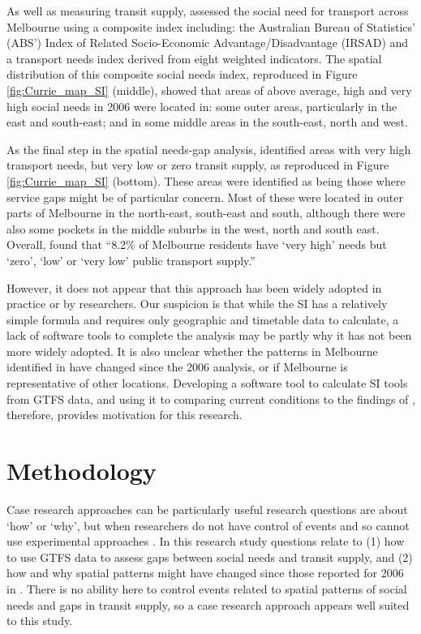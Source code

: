 \documentclass[preprint, 3p,
authoryear]{elsarticle} %
\begin{document}
As well as measuring transit supply, \citet{currie2010identifying}
assessed the social need for transport across Melbourne using a
composite index including: the Australian Bureau of Statistics' (ABS')
Index of Related Socio-Economic Advantage/Disadvantage (IRSAD) and a
transport needs index derived from eight weighted indicators. The
spatial distribution of this composite social needs index, reproduced in
Figure \ref{fig:Currie_map_SI} (middle), showed that areas of above
average, high and very high social needs in 2006 were located in: some
outer areas, particularly in the east and south-east; and in some middle
areas in the south-east, north and west.

As the final step in the spatial needs-gap analysis,
\citet{currie2010identifying} identified areas with very high transport
needs, but very low or zero transit supply, as reproduced in Figure
\ref{fig:Currie_map_SI} (bottom). These areas were identified as being
those where service gaps might be of particular concern. Most of these
were located in outer parts of Melbourne in the north-east, south-east
and south, although there were also some pockets in the middle suburbs
in the west, north and south east. Overall,
\citet{currie2010identifying} found that ``8.2\% of Melbourne residents
have `very high' needs but `zero', `low' or `very low' public transport
supply.''

However, it does not appear that this approach has been widely adopted
in practice or by researchers. Our suspicion is that while the SI has a
relatively simple formula and requires only geographic and timetable
data to calculate, a lack of software tools to complete the analysis may
be partly why it has not been more widely adopted. It is also unclear
whether the patterns in Melbourne identified in
\citet{currie2010identifying} have changed since the 2006 analysis, or
if Melbourne is representative of other locations. Developing a software
tool to calculate SI tools from GTFS data, and using it to comparing
current conditions to the findings of \citet{currie2010identifying},
therefore, provides motivation for this research.

\hypertarget{methodology}{%
\section{Methodology}\label{methodology}}

Case research approaches can be particularly useful research questions
are about `how' or `why', but when researchers do not have control of
events and so cannot use experimental approaches \citep{Yin2009aa}. In
this research study questions relate to (1) how to use GTFS data to
assess gaps between social needs and transit supply, and (2) how and why
spatial patterns might have changed since those reported for 2006 in
\citet{currie2010identifying}. There is no ability here to control
events related to spatial patterns of social needs and gaps in transit
supply, so a case research approach appears well suited to this study.
\end{document}
